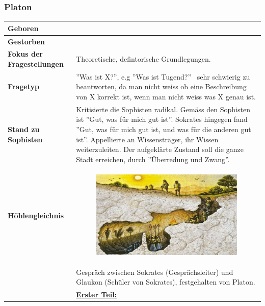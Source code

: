 		\subsubsection{Platon}
			\begin{longtable}{>{\bfseries}p{}p{}}
				\hline
				Geboren
					& \\
				\hline
				Gestorben
					& \\
				\hline
				Fokus der Fragestellungen
					& Theoretische, defintorische Grundlegungen.\\
				\hline
				Fragetyp
					& ''Was ist X?'', e.g ''Was ist Tugend?''\newline
						\textrightarrow\ sehr schwierig zu beantworten, da man nicht weiss ob eine Beschreibung von X korrekt ist, wenn man nicht weiss was X genau ist.\\
				\hline
				Stand zu Sophisten
					& Kritisierte die Sophisten radikal.\newline
					  Gemäss den Sophisten ist ''Gut, was für mich gut ist''.\newline
					  Sokrates hingegen fand ''Gut, was für mich gut ist, und was für die anderen gut ist''.\newline
					  Appellierte an Wissensträger, ihr Wissen weiterzuleiten.\newline
					  Der aufgeklärte Zustand soll die ganze Stadt erreichen, durch ''Überredung und Zwang''.\\
				\hline
				Höhlengleichnis
					&	\vspace{0pt}
						
						\begin{minipage}{0.75\textwidth}
							\begin{figure}[H]\centering
								\includegraphics[scale=0.4]{./pictures/hoehlengleichnis.jpeg}
							\end{figure}
						\end{minipage}\\
					& Gespräch zwischen Sokrates (Gesprächsleiter) und Glaukon (Schüler von Sokrates), festgehalten von Platon.\\
					& \textbf{\underline{Erster Teil:}}\newline
						

\end{longtable}
